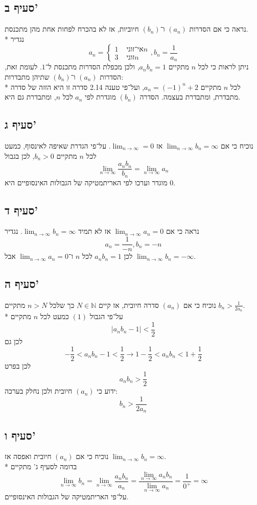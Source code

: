 \documentclass[a4paper]{article}
\def\NN{\mathbb{N}}
\begin{document}
\subsection{סעיף ב'}
נראה כי אם הסדרות $(a_n)$ ו־$(b_n)$ חיוביות,
אז לא בהכרח לפחות אחת מהן מתכנסת. \\*
נגדיר
\[
	a_n = \begin{cases}
		1 & \text{ אי־זוגי} n \\
		3 & \text{ זוגי} n
	\end{cases}, b_n = \frac{1}{a_n}
\]
ניתן לראות כי לכל $n$ מתקיים $a_n b_n = 1$,
ולכן מכפלת הסדרות מתכנסת ל־$1$.
לעומת זאת, הסדרות $(a_n)$ ו־$(b_n)$ שתיהן מתבדרות: \\*
לכל $n$ מתקיים $a_n = {(-1)}^n + 2$,
ועל־פי טענה 2.14 סדרה זו היא הזזה של סדרה מתבדרת, ומתבדרת בעצמה.
הסדרה $(b_n)$ מוגדרת לפי $a_n$ לכל $n$, ומתבדרת גם היא.

\subsection{סעיף ג'}
נוכיח כי אם $\lim_{n \to \infty} b_n = \infty$ אז $\lim_{n \to \infty} = 0$.
על־פי הגדרת שאיפה לאינסוף, כמעט לכל $n$ מתקיים $b_n > 0$,
לכן בגבול
\[
	\lim_{n \to \infty} \frac{a_n b_n}{b_n}
	= \lim_{n \to \infty} a_n
\]
מוגדר וערכו לפי האריתמטיקה של הגבולות האינסופיים היא $0$.

\subsection{סעיף ד'}
נראה כי אם $\lim_{n \to \infty} a_n = 0$ אז לא תמיד
$\lim_{n \to \infty} b_n = \infty$.
נגדיר
\[
	a_n = \frac{1}{-n}, b_n = -n
\]
לכן $a_n b_n = 1$ לכל $n$
ו־$\lim_{n \to \infty} a_n = 0$
אבל $\lim_{n \to \infty} b_n = -\infty$.

\subsection{סעיף ה'}
נוכיח כי אם $(a_n)$ סדרה חיובית, אז קיים $N \in \NN$ כך שלכל $n > N$
מתקיים $b_n > \frac{1}{2a_n}$. \\*
על־פי הגבול $(1)$ כמעט לכל $n$ מתקיים
\[
	\left| a_n b_n - 1 \right| < \frac{1}{2}
\]
לכן גם
\[
	-\frac{1}{2} < a_n b_n - 1 < \frac{1}{2}
	\rightarrow
	1 - \frac{1}{2} < a_n b_n < 1 + \frac{1}{2}
\]
לכן בפרט
\[
	a_n b_n > \frac{1}{2}
\]
ידוע כי $(a_n)$ חיובית ולכן נחלק בערכה:
\[
	b_n > \frac{1}{2 a_n}
\]

\subsection{סעיף ו'}
נוכיח כי אם $(a_n)$ חיובית ואפסה אז $\lim_{n \to \infty} b_n = \infty$. \\*
בדומה לסעיף ג' מתקיים
\[
	\lim_{n \to \infty} b_n
	= \lim_{n \to \infty} \frac{a_n b_n}{a_n}
	= \frac{\lim_{n \to \infty} a_n b_n}{\lim_{n \to \infty} a_n}
	= \frac{1}{0^+}
	= \infty
\]
על־פי האריתמטיקה של הגבולות האינסופיים.
\end{document}
